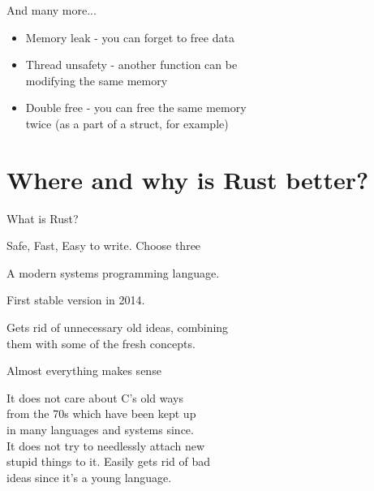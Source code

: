 \documentclass[usenames,dvipsnames,10pt,aspectratio=169]{beamer}
\begin{document}
\begin{frame}{And many more...}
	\Large
	\begin{itemize}[label=$\bullet$]
		\item Memory leak - you can forget to free data
		\item Thread unsafety - another function can be \\
			modifying the same memory
		\item Double free - you can free the same memory\\
			twice (as a part of a struct, for example)
	\end{itemize}
\end{frame}



\section{Where and why is Rust better?}

\begin{frame}{What is Rust?}

\LARGE{\textcolor{ucuyellow}{Safe, Fast, Easy to write. Choose three}}

\vspace{0.8cm}
\large
A modern systems programming language.

\vspace{0.3cm}

First stable version in 2014.\\

\vspace{0.3cm}

Gets rid of unnecessary old ideas, combining \\
them with some of the fresh concepts.
\end{frame}

\begin{frame}{Almost everything makes sense} 

\large
It does not care about C’s old ways\\ 
from the 70s which have been kept up \\
in many languages and systems since.\\ 

\vspace{0.3cm}
It does not try to needlessly attach new\\ 
stupid things to it. Easily gets rid of bad\\ 
ideas since it’s a young language.\\
\end{frame}
\end{document}
